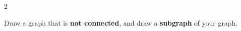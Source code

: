 \documentclass[a4paper,12pt]{book}
\newcounter{question}
\begin{document}
\begin{question}{\thequestion}{2}

    Draw a graph that is \textbf{not connected}, and draw a \textbf{subgraph} of your graph.
    
    
\end{question}

    
\end{document}
